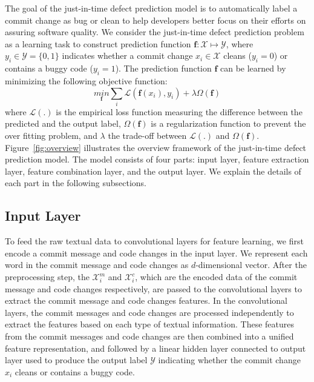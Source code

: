 The goal of the just-in-time defect prediction model is to automatically label a commit change as bug or clean to help developers better focus on their efforts on assuring software quality. We consider the just-in-time defect prediction problem as a learning task to construct prediction function $\textbf{f}:
\mathcal{X} \longmapsto \mathcal{Y}$, where $y_i \in \mathcal{Y} = \{0, 1\}$ indicates whether a commit change $x_i \in \mathcal{X}$ cleans ($y_i = 0$) or contains a buggy code ($y_i = 1$). The prediction function $\textbf{f}$ can be learned by minimizing the following objective function:
\begin{equation}
\underset{\textbf{f}}{min} \sum_{i}\mathcal{L}(\textbf{f}(x_i), y_i) + \lambda\Omega(\textbf{f})
\end{equation}
where $\mathcal{L}(.)$ is the empirical loss function measuring the difference between the predicted and the output label, $\Omega(\textbf{f})$ is a regularization function to prevent the over fitting problem, and $\lambda$ the trade-off between $\mathcal{L}(.)$ and $\Omega(\textbf{f})$. Figure~\ref{fig:overview} illustrates the overview framework of the just-in-time defect prediction model. The model consists of four parts: input layer, feature extraction layer, feature combination layer, and the output layer. We explain the details of each part in the following subsections.

\subsection{Input Layer}
\label{sec:input_layer}
To feed the raw textual data to convolutional layers for feature learning, we first encode a commit message and code changes in the input layer. We represent each word in the commit message and code changes as $d$-dimensional vector. After the preprocessing step, the $\mathcal{X}^{m}_i$ and $\mathcal{X}^{c}_i$, which are the encoded data of the commit message and code changes respectively, are passed to the convolutional layers to extract the commit message and code changes features. In the convolutional layers, the commit messages and code changes are processed independently to extract the features based on each type of textual information. These features from the commit messages and code changes are then combined into a unified feature representation, and followed by a linear hidden layer connected to output layer used to produce the output label $\mathcal{Y}$ indicating whether the commit change $x_i$ cleans or contains a buggy code. 

